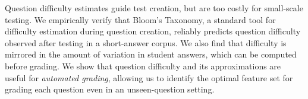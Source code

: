 Question difficulty estimates guide test creation, but are too costly for small-scale testing. We empirically verify that Bloom's Taxonomy, a standard tool for difficulty estimation during question creation, reliably predicts question difficulty observed after testing in a short-answer corpus. We also find that difficulty is mirrored in the amount of variation in student answers, which can be computed before grading. We show that question difficulty and its approximations are useful for \textit{automated grading}, allowing us to identify the optimal feature set for grading each question even in an unseen-question setting.
